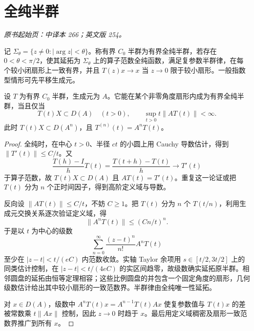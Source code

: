 \section{全纯半群}\label{sec:yosida-09-10}
\noindent\textit{原书起始页：中译本 266；英文版 254。}

记 $\Sigma_\theta=\{z\ne0:|\arg z|<\theta\}$。称有界 $C_0$ 半群为有界全纯半群，若存在 $0<\theta<\pi/2$，使其延拓为 $\Sigma_\theta$ 上的算子范数全纯函数，满足复参数半群律，在每个较小闭扇形上一致有界，并且 $T(z)x\to x$ 当 $z\to0$ 限于较小扇形。一般指数型情形可先平移生成元。

\begin{theorem}[正时间平滑与全纯性]\label{thm:y9-analytic-criterion}
设 $T$ 为有界 $C_0$ 半群，生成元为 $A$。它能在某个非零角度扇形内成为有界全纯半群，当且仅当
\begin{equation}\label{eq:y9-analytic-criterion}
 T(t)X\subset D(A)\quad(t>0),\qquad
 \sup_{t>0}t\|AT(t)\|<\infty.
\end{equation}
此时 $T(t)X\subset D(A^n)$，且 $T^{(n)}(t)=A^nT(t)$。
\end{theorem}
\begin{proof}
全纯时，在中心 $t>0$、半径 $ct$ 的小圆上用 Cauchy 导数估计，得到 $\|T'(t)\|\le C/t$。又
\[
 \frac{T(h)-I}{h}T(t)=\frac{T(t+h)-T(t)}h\longrightarrow T'(t)
\]
于算子范数，故 $T(t)X\subset D(A)$ 且 $AT(t)=T'(t)$。重复这一论证或把 $T(t)$ 分为 $n$ 个正时间因子，得到高阶定义域与导数。

反向设 $\|AT(t)\|\le C/t$，不妨 $C\ge1$。把 $T(t)$ 分为 $n$ 个 $T(t/n)$，利用生成元交换关系逐次验证定义域，得
\begin{equation}\label{eq:y9-analytic-higher}
 \|A^nT(t)\|\le(Cn/t)^n.
\end{equation}
于是以 $t$ 为中心的级数
\[
 \sum_{n=0}^\infty\frac{(z-t)^n}{n!}A^nT(t)
\]
至少在 $|z-t|<t/(eC)$ 内范数收敛。实轴 Taylor 余项用 $s\in[t/2,3t/2]$ 上的同类估计控制，在 $|z-t|<t/(4eC)$ 的实区间趋零，故级数确实延拓原半群。相邻圆盘的延拓由恒等定理相容；这些比例圆盘的并包含一个固定角度的扇形，几何级数估计给出其中较小扇形的一致范数界。半群律由全纯唯一性延拓。

对 $x\in D(A)$，级数中 $A^nT(t)x=A^{n-1}T(t)Ax$ 使复参数值与 $T(t)x$ 的差被常数乘 $t\|Ax\|$ 控制，因此 $z\to0$ 时趋于 $x$。最后用定义域稠密及扇形一致范数界推广到所有 $x$。
\end{proof}

